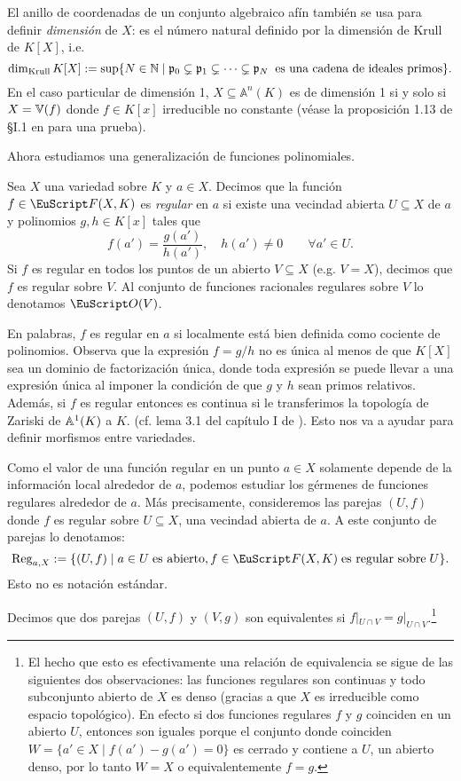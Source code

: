 \documentclass[../../tesis_maestria]{subfiles}
\begin{document}
El anillo de coordenadas de un conjunto algebraico afín también se usa para definir \emph{dimensión} de $X$: es el número natural definido por la dimensión de Krull de $K[X]$, i.e.
\[
	\dim_{\mathrm{Krull}}K[X]:=\sup\{N\in\mathbb{N}\mid \mathfrak{p}_0\subsetneq\mathfrak{p}_1\subsetneq\cdots\subsetneq\mathfrak{p}_N\;\;\text{es una cadena de ideales primos}\}.
\]
En el caso particular de dimensión 1, $X\subseteq\mathbb{A}^n(K)$ es de dimensión 1 si y solo si $X=\mathbb{V}(f)$ donde $f\in K[x]$ irreducible no constante (véase la proposición 1.13 de \S I.1 en \cite{HartshorneAG} para una prueba).

Ahora estudiamos una generalización de funciones polinomiales.

\begin{defin}
	Sea $X$ una variedad sobre $K$ y $a\in X$. Decimos que la función $f\in\Ff(X,K)$ es \emph{regular} en $a$ si existe una vecindad abierta $U\subseteq X$  de $a$ y polinomios $g,h\in K[x]$  tales que
\[
	f(a')=\frac{g(a')}{h(a')},\quad h(a')\neq0 \qquad\forall a'\in U.
\]
Si $f$ es regular en todos los puntos de un abierto $V\subseteq X$ (e.g. $V=X$), decimos que $f$ es regular sobre $V$. Al conjunto de funciones racionales regulares sobre $V$ lo denotamos $\Oo(V)$.
\end{defin}

\begin{nota}
En palabras, $f$ es regular en $a$ si localmente está bien definida como cociente de polinomios. Observa que la expresión $f=g/h$ no es única al menos de que $K[X]$ sea un dominio de factorización única, donde toda expresión se puede llevar a una expresión única al imponer la condición de que $g$ y $h$ sean primos relativos. Además, si $f$ es regular entonces es continua si le transferimos la topología de Zariski de $\mathbb{A}^1(K)$ a $K$. (cf. lema 3.1 del capítulo I de \cite{HartshorneAG}). Esto nos va a ayudar para definir morfismos entre variedades.
\end{nota}

Como el valor de una función regular en un punto $a\in X$ solamente depende de la información local alrededor de $a$, podemos estudiar los gérmenes de funciones regulares alrededor de $a$. Más precisamente, consideremos las parejas $(U,f)$ donde $f$ es regular sobre $U\subseteq X$, una vecindad abierta de $a$. A este conjunto de parejas lo denotamos:
\[
	\mathrm{Reg}_{a,X}:=\{(U,f)\mid a\in U\;\text{es abierto}, f\in\Ff(X,K)\;\text{es regular sobre}\; U\}.
\]
Esto no es notación estándar.

Decimos que dos parejas $(U,f)$ y $(V,g)$ son equivalentes si $f|_{U\cap V}=g|_{U\cap V}$.\footnote{El hecho que esto es efectivamente una relación de equivalencia se sigue de las siguientes dos observaciones: las funciones regulares son continuas y todo subconjunto abierto de $X$ es denso (gracias a que $X$ es irreducible como espacio topológico). En efecto si dos funciones regulares $f$ y $g$ coinciden en un abierto $U$, entonces son iguales porque el conjunto donde coinciden $W=\{a'\in X\mid f(a')-g(a')=0\}$ es cerrado y contiene a $U$, un abierto denso, por lo tanto $W=X$ o equivalentemente $f=g$.}
\end{document}

